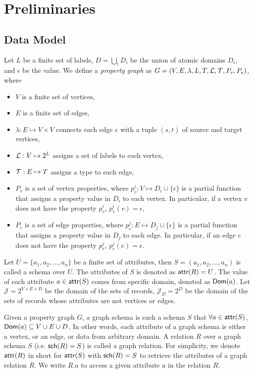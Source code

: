 \section{Preliminaries}
\label{sec:preliminaries}

\subsection{Data Model}
Let $L$ be a finite set of labels, $D = \bigcup_i D_i$ be the union of atomic domains $D_i$, and $\epsilon$ be the  value. We define a \textit{property graph} as $G = (V, E, \lambda, L, T, \mathcal{L}, \mathcal{T}, P_v, P_e)$, where
\begin{itemize}
    \item $V$ is a finite set of vertices,
    \item $E$ is a finite set of edges,
    \item $\lambda: E \mapsto V \times V$ connects each edge $e$ with a tuple $(s, t)$ of source and target vertices,
    \item $\mathcal{L}: V \mapsto 2^L$ assigns a set of labels to each vertex,
    \item $\mathcal{T}: E \mapsto T$ assigns a type to each edge,
    \item $P_v$ is a set of vertex properties, where $p_v^i: V \mapsto D_i \cup \{\epsilon\}$ is a partial function that assigns a property value in $D_i$ to each vertex. 
    In particular, if a vertex $v$ does not have the property $p_v^i$, $p_v^i(v) = \epsilon$,
    \item $P_e$ is a set of edge properties, where $p_e^j: E \mapsto D_j \cup \{\epsilon\}$ is a partial function that assigns a property value in $D_j$ to each edge. 
    In particular, if an edge $e$ does not have the property $p_e^j$, $p_e^j(e) = \epsilon$.
\end{itemize}

Let $U = \{a_1, a_2, \ldots, a_n\}$ be a finite set of attributes, then $S = (a_1, a_2, \ldots, a_n)$ is called a schema over $U$. 
The attributes of $S$ is denoted as ${\mathsf{attr}}(R) = U$. The value of each attribute $a \in {\ensuremath {\mathsf{attr}}}(S)$ comes from specific domain, denoted as ${\mathsf{Dom}}(a)$.
Let $\mathcal{J} = 2^{V \times E \times D}$ be the domain of the sets of records, $\mathcal{J}_D = 2^{D}$ be the domain of the sets of records whose attributes are not vertices or edges. 

Given a property graph $G$, a graph schema is such a schema $S$ that $\forall a \in {\ensuremath {\mathsf{attr}}}(S)$, ${\mathsf{Dom}}(a) \subseteq V \cup E \cup D$. 
In other words, each attribute of a graph schema is either a vertex, or an edge, or data from arbitrary domain. 
A relation $R$ over a graph schema $S$ (i.e. ${\mathsf{sch}}(R) = S$) is called a graph relation. 
For simplicity, we denote ${\mathsf{attr}}(R)$ in short for ${\mathsf{attr}}(S)$ with ${\mathsf{sch}}(R) = S$ to retrieve the attributes of a graph relation $R$. 
We write $R.a$ to access a given attribute $a$ in the relation $R$. 


